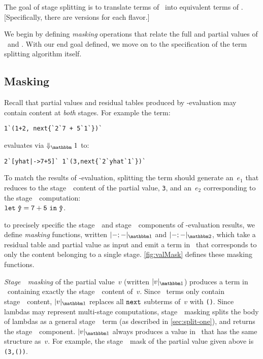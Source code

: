The goal of stage splitting is to translate terms of \lang\ into equivalent terms of \langS.
[Specifically, there are versions for each flavor.]

We begin by defining {\em masking} operations that relate the full and partial values of \lang\ and \langS.
With our end goal defined, we move on to the specification of the term splitting algorithm itself.


\subsection{Masking}

Recall that partial values and residual tables produced by \bbone-evaluation may
contain content at \emph{both} stages. For example the term:
\begin{lstlisting}
1`(1+2, next{`2`7 + 5`1`})`
\end{lstlisting}
evaluates via $\redonesym$ to:
\begin{lstlisting}
2`[yhat|->7+5]` 1`(3,next{`2`yhat`1`})`
\end{lstlisting}
To match the results of \bbone-evaluation,
splitting the term should generate an~$e_1$ that reduces to the stage~\bbone\ content of the partial value, \texttt{3},
and an~$e_2$ corresponding to the stage~\bbtwo\ computation: \\
${\tt let}~{\mathtt{\hat y}} = {\mathtt{7+5}}~{\tt in}~{\mathtt{\hat y}}$.

to precisely specific the stage~\bbone\ and stage~\bbtwo\ components of \bbone-evaluation results, we define 
\emph{masking} functions, written $\masko{{-};{-}}$ and $\maskt{{-};{-}}$, 
which take a residual table and partial value as input and emit a term in \langmono\
that corresponds to only the content belonging to a single stage.
\ref{fig:valMask} defines these masking functions.

\emph{Stage~\bbone\ masking} of the partial value~$v$ (written $\masko{v}$) produces a term in \langmono\ containing exactly
the stage~\bbone\ content of~$v$. Since \next\ terms only contain stage~\bbtwo\
content, $\masko{v}$ replaces all ${\tt next}$ subterms of~$v$ with \texttt{()}.  Since lambdas may represent multi-stage computations, stage~\bbone\ masking splits the body of lambdas as a general stage~\bbone\ term (as described in \ref{sec:split-one}), and returns
the stage~\bbone\ component. $\masko{v}$ always produces a value in \langmono\ that has
the same structure as~$v$.  For example, the stage~\bbone\ mask of the partial value given above is \texttt{(3,())}. 


